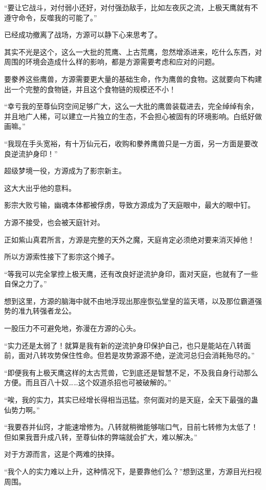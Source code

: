 \begin{this_body}
“要让它战斗，对付弱小还好，对付强劲敌手，比如左夜灰之流，上极天鹰就有不遵守命令，反噬我的可能了。”

已经成功撤离了战场，方源可以静下心来思考了。

其实不光是这个，这么一大批的荒鹰、上古荒鹰，忽然增添进来，吃什么东西，对周围的环境会造成什么样的影响，都是方源需要考虑和应对的问题。

要豢养这些鹰兽，方源需要更大量的基础生命，作为鹰兽的食物。这就要向下构建出一个完整的食物链，并且这个食物链的规模还不小！

“幸亏我的至尊仙窍空间足够广大，这么一大批的鹰兽装载进去，完全绰绰有余，并且地广人稀，可以建立一片独立的生态，不会担心被固有的环境影响。白纸好做画嘛。”

“我现在手头宽裕，有十万仙元石，收购和豢养鹰兽只是一方面，另一方面是要改良逆流护身印！”

超级梦境一役，方源成为了影宗新主。

这大大出乎他的意料。

影宗大败亏输，幽魂本体都被俘虏，导致方源成为了天庭眼中，最大的眼中钉。

方源不接受，也会被天庭针对。

正如紫山真君所言，方源是完整的天外之魔，天庭肯定必须绝对要来消灭掉他！

所以方源索性接下了影宗这个摊子。

“等我可以完全掌控上极天鹰，还有改良好逆流护身印，面对天庭，也就有了一些自保之力了。”

想到这里，方源的脑海中就不由地浮现出那座恢弘堂皇的监天塔，以及那位霸道强势的准九转强者龙公。

一股压力不可避免地，弥漫在方源的心头。

“实力还是太弱了！就算是我有新的逆流护身印保护自己，也只是能站在八转面前，面对八转攻势保住性命。但若是攻势源源不绝，逆流河总归会消耗殆尽的。”

“即便我有上极天鹰这样的太古荒兽，它到底还是智慧不足，不及我自身行动那么方便。而且百八十奴……这个奴道杀招也可被破解的。”

“唉，我的实力，其实已经增长得相当迅猛。奈何面对的是天庭，全天下最强的蛊仙势力啊。”

“我要吞并仙窍，才能速增修为。八转就稍微能够喘口气，目前七转修为太低了！但如果我晋升成八转，至尊仙体的弊端就会扩大，难以解决。”

对于方源而言，这是个两难的抉择。

“我个人的实力难以上升，这种情况下，是要靠他们么？”想到这里，方源目光扫视周围。


\end{this_body}
